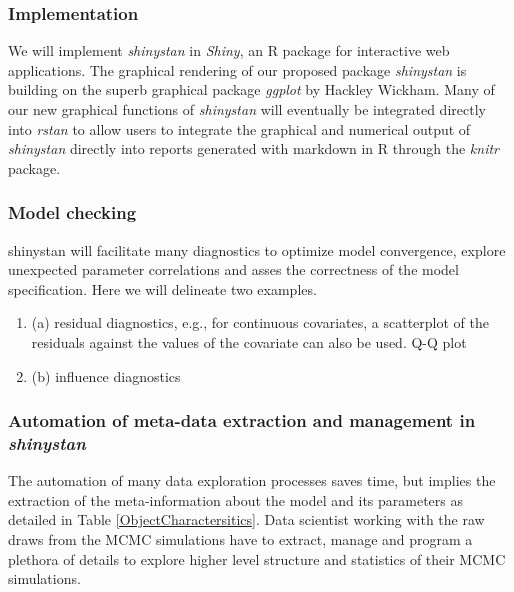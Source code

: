 \documentclass[11pt,notitlepage]{article}
\begin{document}
\subsubsection*{Implementation}
We will implement \textit{shinystan} in \textit{Shiny}, an R package for interactive 
web applications. The graphical rendering of our proposed package \textit{shinystan} 
is building on the superb graphical package \textit{ggplot} by Hackley Wickham. 
Many of our new graphical functions of \textit{shinystan} will eventually be 
integrated directly into \textit{rstan} to allow users to integrate the graphical 
and numerical output of \textit{shinystan} directly into reports generated with 
markdown in R through the \textit{knitr} package.

\subsubsection*{Model checking}
shinystan will facilitate many diagnostics to optimize model convergence, explore unexpected parameter correlations and asses the correctness of the model specification. Here we will delineate two examples.
\begin{enumerate}
\item (a) residual diagnostics, e.g., for continuous covariates, a scatterplot of the residuals against the values of the covariate can also be used. Q-Q plot
 
\item (b) influence diagnostics
\end{enumerate}

\subsubsection*{Automation of meta-data extraction and management in \textit{shinystan}}
The automation of many data exploration processes saves time, but implies the extraction of the meta-information about the model and its parameters as detailed in Table \ref{ObjectCharactersitics}. Data scientist working with the raw draws from the MCMC simulations have to extract, manage and program a plethora of details to explore higher level structure and statistics of their MCMC simulations. 
\end{document}
